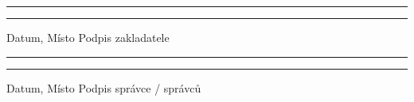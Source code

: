 \documentclass[parskip=half]{scrreprt}
\begin{document}
\begin{contract}
















\end{contract}
\newpage

\vspace{50pt} 
\noindent\rule{7cm}{.4pt}\hfill\rule{7cm}{.4pt}\par 
\noindent Datum, Místo \hfill Podpis zakladatele

\vspace{50pt} 
\noindent\rule{7cm}{.4pt}\hfill\rule{7cm}{.4pt}\par 
\noindent Datum, Místo \hfill Podpis správce / správců
\end{document}
